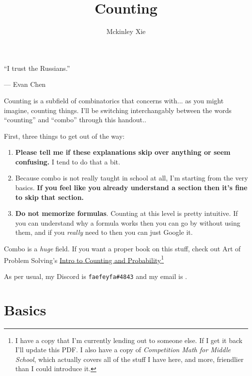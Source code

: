 \documentclass{scrartcl}
\title{Counting}
\author{Mckinley Xie}
\begin{document}
\maketitle
	\epigraph{``I trust the Russians.''}{ --- Evan Chen}
	Counting is a subfield of combinatorics that concerns with... as you might imagine, counting things. I'll be switching interchangably between the words ``counting'' and ``combo'' through this handout..

	First, three things to get out of the way:
	\begin{enumerate}
		\item \textbf{Please tell me if these explanations skip over anything or seem confusing.} I tend to do that a bit.

		\item Because combo is not really taught in school at all, I'm starting from the very basics. \textbf{If you feel like you already understand a section then it's fine to skip that section.} 

		\item \textbf{Do not memorize formulas}. Counting at this level is pretty intuitive. If you can understand why a formula works then you can go by without using them, and if you \emph{really} need to then you can just Google it.
	\end{enumerate}

	Combo is a \emph{huge} field. If you want a proper book on this stuff, check out Art of Problem Solving's \href{https://artofproblemsolving.com/store/book/intro-counting}{Intro to Counting and Probability}\footnote{I have a copy that I'm currently lending out to someone else. If I get it back I'll update this PDF. I also have a copy of \emph{Competition Math for Middle School}, which actually covers all of the stuff I have here, and more, friendlier than I could introduce it.}

	As per usual, my Discord is \texttt{faefeyfa\#4843} and my email is .
	\tableofcontents
	\section{Basics}
\end{document}
